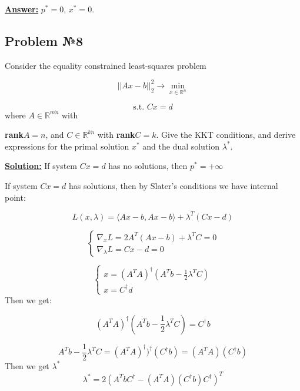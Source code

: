 \underline{\textbf{Answer:}} $p^* = 0$, $x^* = 0$.

\subsection{Problem №8}
Consider the equality constrained least-squares problem 

\begin{equation*}
    ||Ax-b||_2^2  \xrightarrow{} \min\limits_{x \in \mathds{R}^n}
\end{equation*}

\begin{equation*}
   \text{s.t. } Cx = d
\end{equation*}
where $A \in \mathds{R}^{m \dot n}$ with 

\textbf{rank}$A = n$, and $C \in \mathds{R}^{k \dot n}$ with \textbf{rank}$C = k$. Give the KKT conditions, and derive expressions for the primal solution $x^*$ and the dual solution $\lambda^*$.

\underline{\textbf{Solution:}}
If system $Cx = d$ has no solutions, then $p^* = +\infty$

If system $Cx = d$ has solutions, then by Slater's conditions we have internal point:

\begin{equation*}
    L(x, \lambda) = \langle Ax - b, Ax -b \rangle + \lambda^T(Cx-d)
\end{equation*}

\begin{equation*}
    \begin{cases}
    \nabla_x L = 2A^T(Ax-b) + \lambda^TC = 0 \\ 
    \nabla_{\lambda} L = Cx - d= 0
    \end{cases}
\end{equation*}

\begin{equation*}
    \begin{cases}
    x = (A^TA)^{\dag}(A^Tb - \frac{1}{2}\lambda^TC) \\
    x = C^{\dag}d
    \end{cases}
\end{equation*}
Then we get: 

\begin{equation*}
(A^TA)^{\dag}(A^Tb - \frac{1}{2}\lambda^TC) = C^{\dag}b
\end{equation*}

\begin{equation*}
    A^Tb - \frac{1}{2}\lambda^TC = (A^TA)^{\dag})^{\dag} (C^{\dag}b) = (A^TA)(C^{\dag}b)
\end{equation*}
Then we get $\lambda^*$
\begin{equation*}
    \lambda^* = 2(A^TbC^{\dag} - (A^TA)(C^{\dag}b)C^{\dag})^T
\end{equation*}

